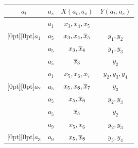 \begin{table}
\begin{center}
\begin{minipage}[t]{190pt}


\vspace*{2ex}





\tabcolsep=12pt


\begin{tabular}{|c|c|c|c|}


\hline


 $a_t$ & $a_s$ & $X(a_t,a_s)$ & $Y(a_t,a_s)$ \\




\hline


 & $a_1$ & $x_3,x_4,x_5$ & $-$\\




\multicolumn{1}{|c|}{\raisebox{-6pt}[0pt][0pt]{$a_1$}} & $a_5$ & $x_3,x_4,\overline x_5$ & $y_1,y_2$\\




 & $a_5$ & $x_3,\overline x_4$ & $y_1,y_3$\\




 & $a_5$ & $\overline x_3$ & $y_2$\\


\hline




 & $a_1$ & $x_5,x_6,x_7$ & $y_2,y_3,y_4$\\




\multicolumn{1}{|c|}{\raisebox{-6pt}[0pt][0pt]{$a_2$}} & $a_5$ & $x_5,x_6,\overline x_7$ & $y_3$ \\




 & $a_5$ & $x_5,\overline x_6$ & $y_2,y_3$\\




 & $a_5$ & $\overline x_5$ & $y_2$\\


\hline




 & $a_9$ & $x_5,x_6$ & $y_2,y_3$\\




\multicolumn{1}{|c|}{\raisebox{-6pt}[0pt][0pt]{$a_3$}} & $a_9$ & $x_5,\overline x_6$ & $y_3,y_4$\\



\end{tabular}
\end{minipage}
\end{center}
\end{table}
